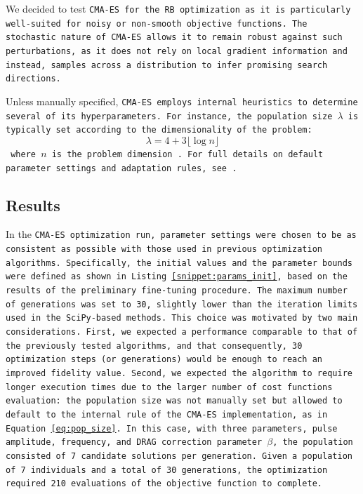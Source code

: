 We decided to test \tt{CMA-ES} for the RB optimization as it is particularly well-suited for noisy or non-smooth objective functions. 
The stochastic nature of \tt{CMA-ES} allows it to remain robust against such perturbations, as it does not rely on local gradient information and instead, samples across a distribution to infer promising search directions.

Unless manually specified, \tt{CMA-ES} employs internal heuristics to determine several of its hyperparameters. 
For instance, the population size $\lambda$ is typically set according to the dimensionality of the problem:
\begin{equation}\label{eq:pop_size}
    \lambda = 4+3\lfloor \log{n}\rfloor
\end{equation}
where $n$ is the problem dimension \cite{hansen_pycma_2024}.
For full details on default parameter settings and adaptation rules, see \cite{cmaessimplepractical}.

\subsection{Results}

In the \tt{CMA-ES} optimization run, parameter settings were chosen to be as consistent as possible with those used in previous optimization algorithms.
Specifically, the initial values and the parameter bounds were defined as shown in Listing \ref{snippet:params_init}, based on the results of the preliminary fine-tuning procedure. 
The maximum number of generations was set to 30, slightly lower than the iteration limits used in the \texttt{SciPy}-based methods.
This choice was motivated by two main considerations. First, we expected a performance comparable to that of the previously tested algorithms, and that consequently, 30 optimization steps (or generations) would be enough to reach an improved fidelity value.
Second, we expected the algorithm to require longer execution times due to the larger number of cost functions evaluation: the population size was not manually set but allowed to default to the internal rule of the \tt{CMA-ES} implementation, as in Equation \ref{eq:pop_size}.
In this case, with three parameters, pulse amplitude, frequency, and DRAG correction parameter $\beta$, the population consisted of 7 candidate solutions per generation.
Given a population of 7 individuals and a total of 30 generations, the optimization required 210 evaluations of the objective function to complete. 

